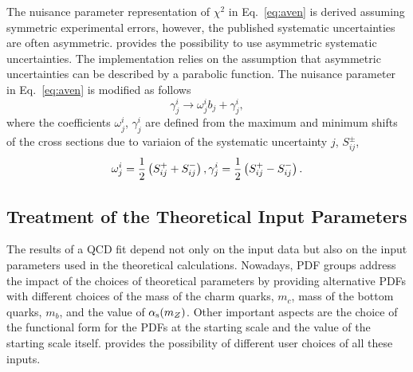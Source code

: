 %
The nuisance parameter representation of $\chi^2$ in Eq.~\ref{eq:aven} is derived assuming 
symmetric experimental errors, however, the published systematic uncertainties are 
often asymmetric.
\fitter provides the possibility to use asymmetric systematic uncertainties.
The implementation relies on the assumption that 
asymmetric uncertainties can be described by a parabolic function.
The nuisance parameter in Eq.~\ref{eq:aven} is modified as follows
\begin{equation}
  \gamma^i_{j} \to \omega^i_{j}b_j + \gamma^i_{j},
\end{equation}
where the coefficients $\omega^i_{j}$, $\gamma^i_{j}$ are defined  
from the maximum and minimum shifts of the cross sections due to variaion of the systematic uncertainty $j$, 
$S_{ij}^{\pm}$,
\begin{equation}
  \omega^i_{j}=\frac{1}{2}\left(S_{ij}^{+}+S_{ij}^{-}\right), \\
  \gamma^i_{j}=\frac{1}{2}\left(S_{ij}^{+}-S_{ij}^{-}\right). 
\end{equation}





\subsection{Treatment of the Theoretical Input Parameters}
\label{sec:theoryerr}

The results of a QCD fit depend not only on the input data but also on the 
input parameters used in the theoretical calculations. Nowadays, PDF groups 
address the impact of the choices of theoretical parameters by providing
alternative PDFs with different choices of the mass of the charm quarks, $m_c$, 
mass of the bottom quarks, $m_b$, and the value of $\alpha_\mathrm{s}(m_Z)$. 
Other important aspects are the choice of the functional form for the PDFs at the 
starting scale and the value of the starting scale itself. \fitter provides the
possibility of different user choices of all these inputs.%

